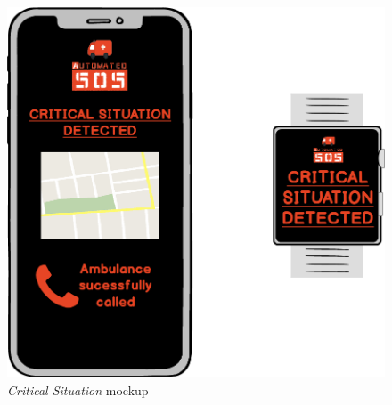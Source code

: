 \begin{figure}
\begin{center}
  \includegraphics[width=\textwidth]{img/mockup/Critical_Situation.png}
  \hspace{0.05\linewidth}
  \centering
  \caption{\textit{Critical Situation} mockup}
  \label{img:criticalSituationMockup}
\end{center}
\end{figure}
